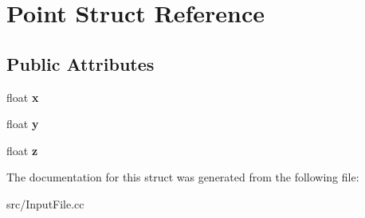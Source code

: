 \hypertarget{structPoint}{\section{Point Struct Reference}
\label{structPoint}
}
\subsection*{Public Attributes}
\begin{DoxyCompactItemize}
\item 
\hypertarget{structPoint_a05dfe2dfbde813ad234b514f30e662f1}{float {\bfseries x}}\label{structPoint_a05dfe2dfbde813ad234b514f30e662f1}

\item 
\hypertarget{structPoint_a6101960c8d2d4e8ea1d32c9234bbeb8d}{float {\bfseries y}}\label{structPoint_a6101960c8d2d4e8ea1d32c9234bbeb8d}

\item 
\hypertarget{structPoint_a9a666531e0e99adff132be93d2407d0c}{float {\bfseries z}}\label{structPoint_a9a666531e0e99adff132be93d2407d0c}

\end{DoxyCompactItemize}


The documentation for this struct was generated from the following file\+:\begin{DoxyCompactItemize}
\item 
src/Input\+File.\+cc\end{DoxyCompactItemize}
